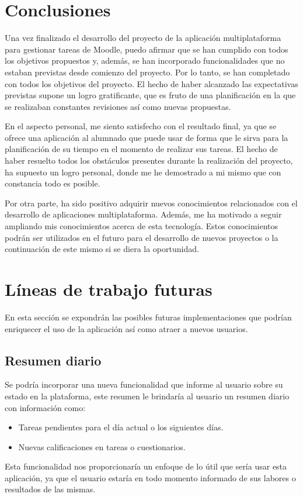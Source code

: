 
\section{Conclusiones}
Una vez finalizado el desarrollo del proyecto de la aplicación multiplataforma para gestionar tareas de Moodle, puedo afirmar que se han cumplido con todos los objetivos propuestos y, además, se han incorporado funcionalidades que no estaban previstas desde comienzo del proyecto. Por lo tanto, se han completado con todos los objetivos del proyecto. El hecho de haber alcanzado las expectativas previstas supone un logro gratificante, que es fruto de una planificación en la que se realizaban constantes revisiones así como nuevas propuestas.

En el aspecto personal, me siento satisfecho con el resultado final, ya que se ofrece una aplicación al alumnado que puede usar de forma que le sirva para la planificación de su tiempo en el momento de realizar sus tareas. El hecho de haber resuelto todos los obstáculos presentes durante la realización del proyecto, ha supuesto un logro personal, donde me he demostrado a mi mismo que con constancia todo es posible.

Por otra parte, ha sido positivo adquirir nuevos conocimientos relacionados con el desarrollo de aplicaciones multiplataforma. Además, me ha motivado a seguir ampliando mis conocimientos acerca de esta tecnología. Estos conocimientos podrán ser utilizados en el futuro para el desarrollo de nuevos proyectos o la continuación de este mismo si se diera la oportunidad.

\section{Líneas de trabajo futuras}
En esta sección se expondrán las posibles futuras implementaciones que podrían enriquecer el uso de la aplicación así como atraer a nuevos usuarios.

\subsection{Resumen diario}
Se podría incorporar una nueva funcionalidad que informe al usuario sobre su estado en la plataforma, este resumen le brindaría al usuario un resumen diario con información como:
\begin{itemize}
    \item Tareas pendientes para el día actual o los siguientes días.
    \item Nuevas calificaciones en tareas o cuestionarios.
\end{itemize}
Esta funcionalidad nos proporcionaría un enfoque de lo útil que sería usar esta aplicación, ya que el usuario estaría en todo momento informado de sus labores o resultados de las mismas.

